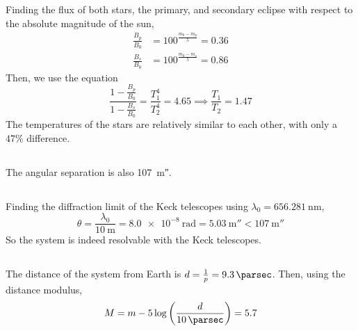 \documentclass{article}
\begin{document}
\subsection{}

Finding the flux of both stars, the primary, and secondary eclipse with respect to the absolute magnitude of the sun,
\begin{align}
    \frac{B_p}{B_0} &= 100^{\frac{m_0 - m_p}{5}} = \num{0.36} \\
    \frac{B_s}{B_0} &= 100^{\frac{m_0 - m_s}{5}} = \num{0.86}
\end{align}
Then, we use the equation
\begin{equation}
    \frac{1 - \frac{B_p}{B_0}}{1 - \frac{B_s}{B_0}} = \frac{T_1^4}{T_2^4} = \num{4.65} \implies \frac{T_1}{T_2} = \num{1.47}
\end{equation}
The temperatures of the stars are relatively similar to each other, with only a \(47\%\) difference.

\subsection{}

The angular separation is also \SI{107}{\milli\arcsecond}.

\subsection{}

Finding the diffraction limit of the Keck telescopes using \(\lambda_0 = \SI{656.281}{\nano\meter}\),
\begin{equation}
    \theta = \frac{\lambda_0}{\SI{10}{\meter}} = \SI{8.0e-8}{\radian} = \SI{5.03}{\milli\arcsecond} < \SI{107}{\milli\arcsecond}
\end{equation}
So the system is indeed resolvable with the Keck telescopes.

\subsection{}

The distance of the system from Earth is \(d = \frac{1}{p} = \SI{9.3}{\parsec}\).
Then, using the distance modulus,
\begin{equation}
    M = m - 5 \log\left(\frac{d}{\SI{10}{\parsec}}\right) = \num{5.7}
\end{equation}

\subsection{}
\end{document}

